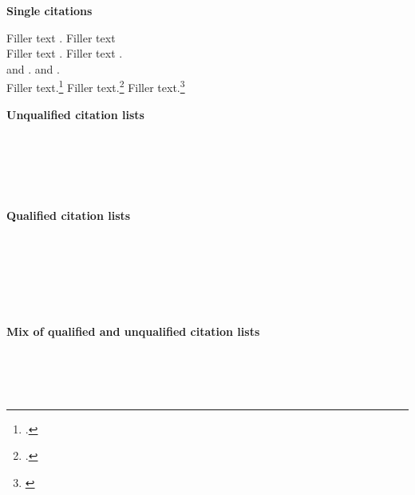 \documentclass{report}
\begin{document}
\null\vfill
\textbf{Single citations}

Filler text \autocite{aristotle:poetics}. Filler text \parencite{kant:ku} \\
Filler text \parencite[See][23]{aristotle:poetics}.
Filler text \parencite[1--10]{kant:ku}. \\
\textcite{aristotle:poetics} and \textcite{kant:ku}.
\textcite[e.g.][]{aristotle:poetics} and \textcite[10]{kant:ku}. \\
Filler text.\footcite[23]{aristotle:poetics} Filler text.\footcite[1--10]{aristotle:rhetoric}
Filler text.\footnote{\smartcite[10--15]{companion}}

\textbf{Unqualified citation lists}

\textcite{aristotle:poetics,aristotle:rhetoric} \\
\textcite[e.g.][]{aristotle:poetics,aristotle:rhetoric} \\
\textcite[10--15]{aristotle:poetics,aristotle:rhetoric} \\
\textcite[e.g.][10--15]{aristotle:poetics,aristotle:rhetoric} \\
\parencite[See][for example]{aristotle:poetics,aristotle:rhetoric}

\textbf{Qualified citation lists}

\textcites{aristotle:poetics}{aristotle:rhetoric} \\
\textcites(See)(){aristotle:poetics}[cf.][]{aristotle:rhetoric} \\
\textcites(See)()[10]{aristotle:poetics}[10]{aristotle:rhetoric} \\
\textcites(See)()[10--15]{aristotle:poetics}[cf.][10]{aristotle:rhetoric} \\
\textcites(See)()[e.g.][10--15]{aristotle:poetics}[cf.][10]{aristotle:rhetoric} \\
\parencites(See)()[10--15]{aristotle:poetics}[cf.][10]{aristotle:rhetoric}

\textbf{Mix of qualified and unqualified citation lists}

\textcites(See)()[e.g.][]{aristotle:poetics}[10]{bertram,companion} \\
\textcites[e.g.][]{aristotle:poetics,aristotle:rhetoric}[10]{companion} \\
\textcites[10]{aristotle:poetics,aristotle:rhetoric}[cf.][]{bertram} \\
\textcites[15]{aristotle:poetics}[cf.][10]{bertram,companion}

\printbibliography
\end{document}
